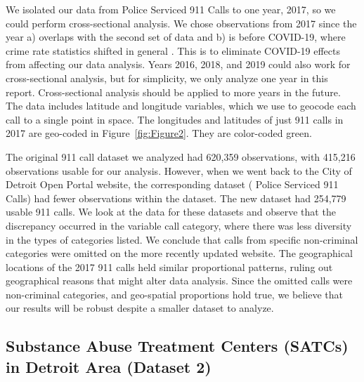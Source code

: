\documentclass[12pt]{article}
\begin{document}
We isolated our data from Police Serviced 911 Calls to one year, 2017, so we could perform cross-sectional analysis. We chose observations from 2017 since the year a) overlaps with the second set of data and b) is before COVID-19, where crime rate statistics shifted in general \citealp{covid_and_crime}. This is to eliminate COVID-19 effects from affecting our data analysis. Years 2016, 2018, and 2019 could also work for cross-sectional analysis, but for simplicity, we only analyze one year in this report. Cross-sectional analysis should be applied to more years in the future. The data includes latitude and longitude variables, which we use to geocode each call to a single point in space. The longitudes and latitudes of just 911 calls in 2017 are geo-coded in Figure~\ref{fig:Figure2}. They are color-coded green. 

The original 911 call dataset we analyzed had 620,359 observations, with 415,216 observations usable for our analysis. However, when we went back to the City of Detroit Open Portal website, the corresponding dataset ( Police Serviced 911 Calls) had fewer observations within the dataset. The new dataset had 254,779 usable 911 calls. We look at the data for these datasets and observe that the discrepancy occurred in the variable call category, where there was less diversity in the types of categories listed. We conclude that calls from specific non-criminal categories were omitted on the more recently updated website. The geographical locations of the 2017 911 calls held similar proportional patterns, ruling out geographical reasons that might alter data analysis. Since the omitted calls were non-criminal categories, and geo-spatial proportions hold true, we believe that our results will be robust despite a smaller dataset to analyze.\footnotemark[1]

\subsection{Substance Abuse Treatment Centers (SATCs) in Detroit Area (Dataset 2)}
\end{document}
